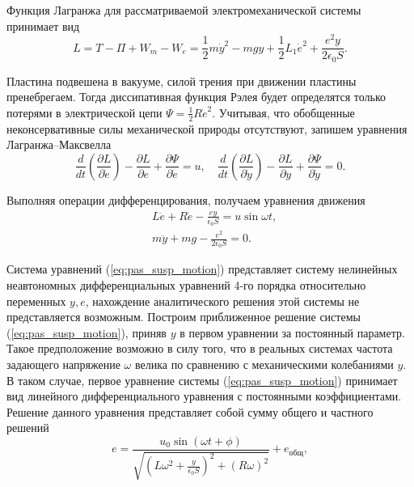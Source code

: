 Функция Лагранжа для рассматриваемой электромеханической системы принимает вид
\[
L = T - \Pi + W_m - W_e = \frac{1}{2}m \dot y^2 - mgy + \frac{1}{2}L_1 \dot e^2 + \frac{e^2 y}{2 \epsilon_0 S}.
\]

Пластина подвешена в вакууме, силой трения при движении пластины пренебрегаем. Тогда диссипативная функция Рэлея будет определятся только потерями в электрической цепи $\Psi = \frac{1}{2}R \dot e^2$. Учитывая, что обобщенные неконсервативные силы механической природы отсутствуют, запишем уравнения Лагранжа–Максвелла \cite{Martynenko_andyn}
\[
\frac{d}{dt} \left( \frac{\partial L}{\partial \dot e} \right) - \frac{\partial L}{\partial e} + \frac{\partial \Psi}{\partial \dot e} = u, \quad
\frac{d}{dt} \left( \frac{\partial L}{\partial \dot y} \right) - \frac{\partial L}{\partial y} + \frac{\partial \Psi}{\partial \dot y} = 0.
\]

Выполняя операции дифференцирования, получаем уравнения движения
\begin{equation}
  \label{eq:pas_susp_motion}
    \begin{alignedat}{2}
    &L \ddot e + R \dot e - \frac{e y}{\epsilon_0 S} = u \sin \omega t, \\
    &m \ddot y + m g - \frac{e^2}{2 \epsilon_0 S} = 0.
    \end{alignedat}
\end{equation}

Система уравнений (\ref{eq:pas_susp_motion}) представляет систему нелинейных неавтономных дифференциальных уравнений 4-го порядка относительно переменных $y, e$, нахождение аналитического решения этой системы не представляется возможным.
Построим приближенное решение системы (\ref{eq:pas_susp_motion}), приняв $y$ в первом уравнении за постоянный параметр. Такое предположение возможно в силу того, что в реальных системах частота задающего напряжение $\omega$  велика по сравнению с механическими колебаниями $y$. В таком случае, первое уравнение системы (\ref{eq:pas_susp_motion}) принимает вид линейного дифференциального уравнения с постоянными коэффициентами. Решение данного уравнения представляет собой сумму общего и частного решений \cite{Martynenko}
\begin{equation}
  \label{eq:pas_susp_charge}
    e = \frac{u_0 \sin (\omega t + \phi)}{\sqrt{\left(L \omega^2 + \frac{y}{\epsilon_0 S} \right)^2 
    + \left( R \omega \right)^2}} + e_{\text{общ}},
\end{equation}


